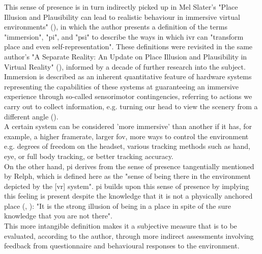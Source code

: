 This sense of presence is in turn indirectly picked up in Mel Slater's "Place Illusion and Plausibility can lead to realistic behaviour in immersive virtual environments" (\cite{slater-2009-place}), in which the author presents a definition of the terms "immersion", "\gls{pi}", and "\gls{psi}" to describe the ways in which \gls{ivr} can "transform place and even self-representation". These definitions were revisited in the same author's "A Separate Reality: An Update on Place Illusion and Plausibility in Virtual Reality" (\cite{slater-2022-separate}), informed by a decade of further research into the subject.\\

Immersion is described as an inherent quantitative feature of hardware systems representing the capabilities of these systems at guaranteeing an immersive experience through so-called sensorimotor contingencies, referring to actions we carry out to collect information, e.g. turning our head to view the scenery from a different angle (\cite{slater-2009-place}).\\
A certain system can be considered 'more immersive' than another if it has, for example, a higher framerate, larger \gls{fov}, more ways to control the environment e.g. degrees of freedom on the headset, various tracking methods such as hand, eye, or full body tracking, or better tracking accuracy.\\

On the other hand, \gls{pi} derives from the sense of presence tangentially mentioned by Relph, which is defined here as the "sense of being there in the environment depicted by the [\gls{vr}] system". \gls{pi} builds upon this sense of presence by implying this feeling is present despite the knowledge that it is not a physically anchored place (\cite{slater-2009-place}, \cite{slater-2022-separate}): "It is the strong illusion of being in a place in spite of the sure knowledge that you are not there".\\
This more intangible definition makes it a subjective measure that is to be evaluated, according to the author, through more indirect assessments involving feedback from questionnaire and behavioural responses to the environment.\\


